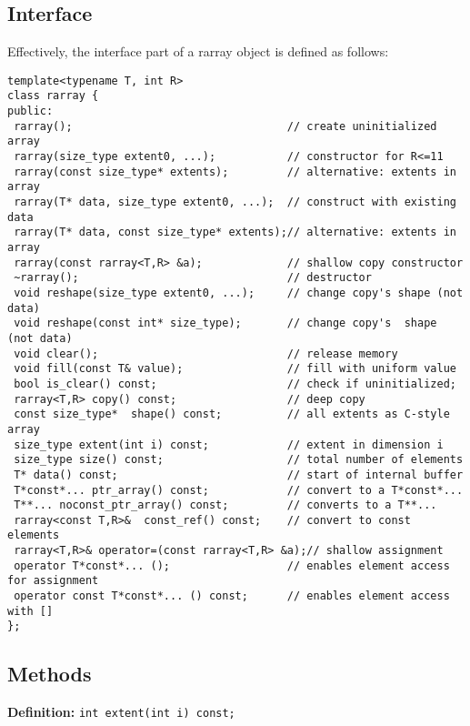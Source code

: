 \documentclass[11pt,twoside]{article}
\begin{document}
\subsection{Interface}
Effectively, the interface part of a rarray object is defined as follows:%
\vspace{-8pt}%
\begin{framed}\vspace{-14pt}%
\begin{verbatim}
template<typename T, int R>
class rarray {
public:    
 rarray();                                 // create uninitialized array
 rarray(size_type extent0, ...);           // constructor for R<=11
 rarray(const size_type* extents);         // alternative: extents in array
 rarray(T* data, size_type extent0, ...);  // construct with existing data
 rarray(T* data, const size_type* extents);// alternative: extents in array
 rarray(const rarray<T,R> &a);             // shallow copy constructor   
 ~rarray();                                // destructor 
 void reshape(size_type extent0, ...);     // change copy's shape (not data)
 void reshape(const int* size_type);       // change copy's  shape (not data)
 void clear();                             // release memory
 void fill(const T& value);                // fill with uniform value
 bool is_clear() const;                    // check if uninitialized;
 rarray<T,R> copy() const;                 // deep copy
 const size_type*  shape() const;          // all extents as C-style array
 size_type extent(int i) const;            // extent in dimension i
 size_type size() const;                   // total number of elements
 T* data() const;                          // start of internal buffer
 T*const*... ptr_array() const;            // convert to a T*const*... 
 T**... noconst_ptr_array() const;         // converts to a T**... 
 rarray<const T,R>&  const_ref() const;    // convert to const elements
 rarray<T,R>& operator=(const rarray<T,R> &a);// shallow assignment
 operator T*const*... ();                  // enables element access for assignment
 operator const T*const*... () const;      // enables element access with []
};
\end{verbatim}
\end{framed}



\subsection{Methods}

\noindent\textbf{Definition:} \texttt{int extent(int i) const;}
\end{document}
